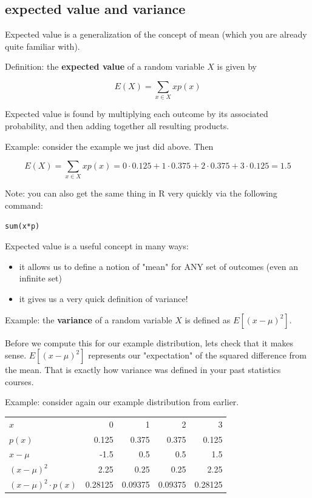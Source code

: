 \documentclass[11pt]{article}
\begin{document}
\subsection*{expected value and variance}
\label{sec-1-2}
Expected value is a generalization of the concept of mean (which you are already quite familiar with).

Definition: the \textbf{expected value} of a random variable $X$ is given by

\[
E(X) = \sum_{x\in X}xp(x)
\]

Expected value is found by multiplying each outcome by its associated probability, and then adding together all resulting products.

Example: consider the example we just did above.  Then

\[
E(X) = \sum_{x\in X}xp(x) = 0\cdot 0.125 + 1\cdot 0.375 +2\cdot 0.375 + 3\cdot 0.125 = 1.5
\]

Note: you can also get the same thing in R very quickly via the following command:

\begin{verbatim}
sum(x*p)
\end{verbatim}

Expected value is a useful concept in many ways:
\begin{itemize}
\item it allows us to define a notion of "mean" for ANY set of outcomes (even an infinite set)
\item it gives us a very quick definition of variance!
\end{itemize}

Example: the \textbf{variance} of a random variable $X$ is defined as $E[(x-\mu)^2]$.

Before we compute this for our example distribution, lets check that it makes sense.  $E[(x-\mu)^2]$ represents our "expectation" of the squared difference from the mean.  That is exactly how variance was defined in your past statistics courses.

Example: consider again our example distribution from earlier.

\begin{center}
\begin{tabular}{lrrrr}
$x$ & 0 & 1 & 2 & 3\\
$p(x)$ & 0.125 & 0.375 & 0.375 & 0.125\\
$x-\mu$ & -1.5 & 0.5 & 0.5 & 1.5\\
$(x-\mu)^2$ & 2.25 & 0.25 & 0.25 & 2.25\\
$(x-\mu)^2\cdot p(x)$ & 0.28125 & 0.09375 & 0.09375 & 0.28125\\
\end{tabular}
\end{center}
\end{document}

